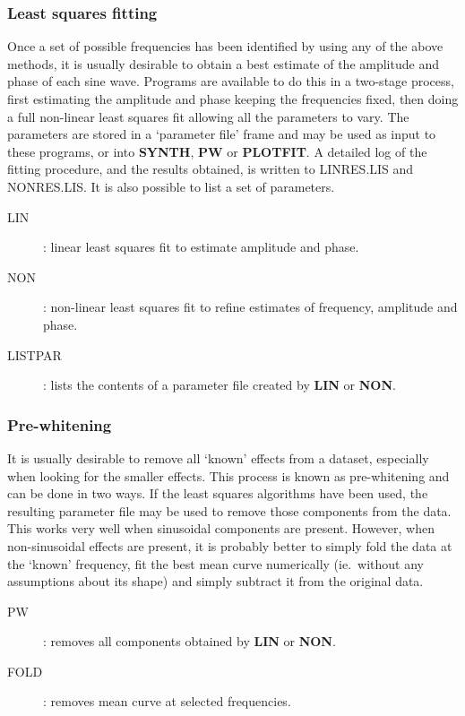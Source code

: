 \subsubsection {Least squares fitting}
Once a set of possible frequencies has been identified by using any of the above
methods, it is usually desirable to obtain a best estimate of the amplitude and
phase of each sine wave.
Programs are available to do this in a two-stage process, first estimating the
amplitude and phase keeping the frequencies fixed, then doing a full non-linear
least squares fit allowing all the parameters to vary.
The parameters are stored in a `parameter file' frame and may be used as input
to these programs, or into {\bf SYNTH}, {\bf PW} or {\bf PLOTFIT}.
A detailed log of the fitting procedure, and the results obtained, is written to
LINRES.LIS and NONRES.LIS.
It is also possible to list a set of parameters.
\begin{description}
\begin{description}
\item [LIN]: linear least squares fit to estimate amplitude and phase.
\item [NON]: non-linear least squares fit to refine estimates of frequency,
amplitude and phase.
\item [LISTPAR]: lists the contents of a parameter file created by {\bf LIN}
or {\bf NON}.
\end{description}
\end{description}
\subsubsection {Pre-whitening}
It is usually desirable to remove all `known' effects from a dataset, especially
when looking for the smaller effects.
This process is known as pre-whitening and can be done in two ways.
If the least squares algorithms have been used, the resulting parameter file
may be used to remove those components from the data.
This works very well when sinusoidal components are present.
However, when non-sinusoidal effects are present, it is probably better to
simply fold the data at the `known' frequency, fit the best mean curve
numerically (ie.\ without any assumptions about its shape) and simply subtract
it from the original data.
\begin{description}
\begin{description}
\item [PW]: removes all components obtained by {\bf LIN} or {\bf NON}.
\item [FOLD]: removes mean curve at selected frequencies.
\end{description}
\end{description}
